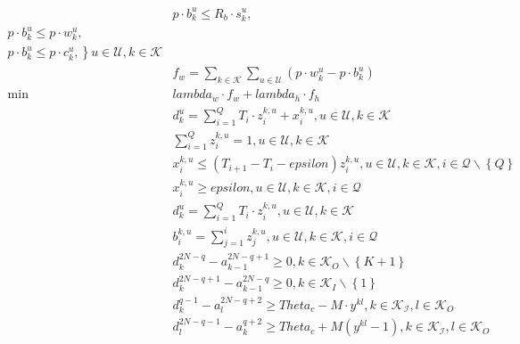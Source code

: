 \begin{align}
  &  p \cdot b_{k}^{u} \leq R_{b} \cdot s_{k}^{u} , \\ p \cdot b_{k}^{u} \leq p \cdot w_{k}^{u} , \\ p \cdot b_{k}^{u} \leq p \cdot c_{k}^{u} , \left.\right\} u \in \mathbf{\mathcal{U}} , k \in \mathbf{\mathcal{K}} \tag{eq\_0012} \\
  & f_{w} = \underset{k \in \mathbf{\mathcal{K}}}{\sum} \underset{u \in \mathbf{\mathcal{U}}}{\sum} \left(p \cdot w_{k}^{u} - p \cdot b_{k}^{u}\right) \tag{eq\_0014} \\
  \min\quad & \mathit{lambda}_{w} \cdot f_{w} + \mathit{lambda}_{h} \cdot f_{h} \tag{eq\_0016} \\
  & d_{k}^{u} = \sum_{i = 1}^{Q} T_{i} \cdot z_{i}^{k , u} + x_{i}^{k , u} , u \in \mathbf{\mathcal{U}} , k \in \mathbf{\mathcal{K}} \tag{eq\_0017} \\
  & \sum_{i = 1}^{Q} z_{i}^{k , u} = 1 , u \in \mathbf{\mathcal{U}} , k \in \mathbf{\mathcal{K}} \tag{eq\_0018} \\
  & x_{i}^{k , u} \leq \left(T_{i + 1} - T_{i} - \mathit{epsilon}\right) z_{i}^{k , u} , u \in \mathbf{\mathcal{U}} , k \in \mathbf{\mathcal{K}} , i \in \mathbf{\mathcal{Q}} \backslash \left\{Q\right\} \tag{eq\_0019\_a} \\
  & x_{i}^{k , u} \geq \mathit{epsilon} , u \in \mathbf{\mathcal{U}} , k \in \mathbf{\mathcal{K}} , i \in \mathbf{\mathcal{Q}} \tag{eq\_0019\_b} \\
  & d_{k}^{u} = \sum_{i = 1}^{Q} T_{i} \cdot z_{i}^{k , u} , u \in \mathbf{\mathcal{U}} , k \in \mathbf{\mathcal{K}} \tag{eq\_0020} \\
  & b_{i}^{k , u} = \sum_{j = 1}^{i} z_{j}^{k , u} , u \in \mathbf{\mathcal{U}} , k \in \mathbf{\mathcal{K}} , i \in \mathbf{\mathcal{Q}} \tag{eq\_0022} \\
  & d_{k}^{2 N - q} - a_{k - 1}^{2 N - q + 1} \geq 0 , k \in \mathbf{\mathcal{K}}_{O} \backslash \left\{K + 1\right\} \tag{eq\_0033} \\
  & d_{k}^{2 N - q + 1} - a_{k - 1}^{2 N - q} \geq 0 , k \in \mathbf{\mathcal{K}}_{I} \backslash \left\{1\right\} \tag{eq\_0034} \\
  & d_{k}^{q - 1} - a_{l}^{2 N - q + 2} \geq \mathit{Theta}_{c} - M \cdot y^{k l} , k \in \mathbf{\mathcal{K}}_{\mathbf{\mathcal{I}}} , l \in \mathbf{\mathcal{K}}_{O} \tag{eq\_0035} \\
  & d_{l}^{2 N - q - 1} - a_{k}^{q + 2} \geq \mathit{Theta}_{c} + M \left(y^{k l} - 1\right) , k \in \mathbf{\mathcal{K}}_{\mathbf{\mathcal{I}}} , l \in \mathbf{\mathcal{K}}_{O} \tag{eq\_0036} \\

\end{align}
